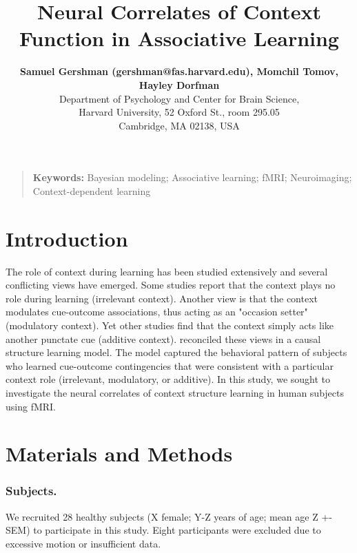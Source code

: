 \documentclass[10pt,letterpaper]{article}
\title{Neural Correlates of Context Function in Associative Learning}
\author{{\large \bf Samuel Gershman (gershman@fas.harvard.edu), Momchil Tomov, Hayley Dorfman}  \\
  Department of Psychology and Center for Brain Science,\\
  Harvard University, 52 Oxford St., room 295.05\\
Cambridge, MA 02138, USA}
\begin{document}
\maketitle


\begin{quote}
\small
\textbf{Keywords:} 
Bayesian modeling; Associative learning; fMRI; Neuroimaging; Context-dependent learning
\end{quote}

\section{Introduction}

The role of context during learning has been studied extensively and several conflicting views have emerged. Some studies report that the context plays no role during learning (irrelevant context). Another view is that the context modulates cue-outcome associations, thus acting as an "occasion setter" (modulatory context). Yet other studies find that the context simply acts like another punctate cue (additive context).  reconciled these views in a causal structure learning model. The model captured the behavioral pattern of subjects who learned cue-outcome contingencies that were consistent with a particular context role (irrelevant, modulatory, or additive). In this study, we sought to investigate the neural correlates of context structure learning in human subjects using fMRI.

\section{Materials and Methods}

\subsubsection{Subjects.}

We recruited 28 healthy subjects (X female; Y-Z years of age; mean age Z +- SEM) to participate in this study. Eight participants were excluded due to excessive motion or insufficient data.
\end{document}
